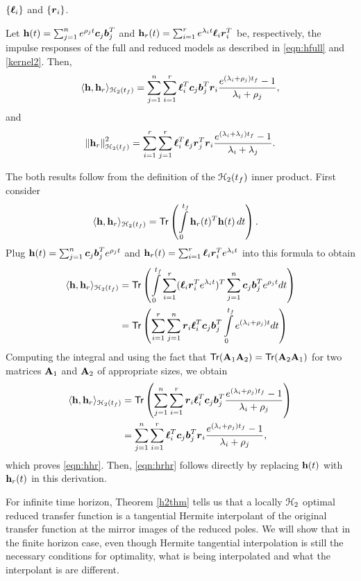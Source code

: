 \documentclass[twocolumn]{autart}
\begin{document}
$\{\boldsymbol{\ell}_i\}$ and $\{\boldsymbol{r}_i\}$.
\begin{Lemma}\label{minnerexp}

Let  $\mathbf{h} (t)= \sum_{j=1}^n e^{\rho_jt} \boldsymbol{c}_j \boldsymbol{b}_j^T $ and $\mathbf{h}_r(t) = \sum_{i=1}^r e^{\lambda_it}\boldsymbol{\ell}_i  \boldsymbol{r}_i^T $ be, respectively, the impulse responses of the full and reduced models  as described in \eqref{eqn:hfull} and \eqref{kernel2}.
Then,
\begin{align} \label{eqn:hhr}
\langle\mathbf{h}, \mathbf{h}_r\rangle_{\EuScript{H}_2({t_f})}=\sum_{j=1}^n\sum_{i=1}^r\boldsymbol{\ell}_{i}^T\boldsymbol{c}_j\boldsymbol{b}_j^T\boldsymbol{r}_{i}\dfrac{e^{(\lambda_i+\rho_j){t_f}}-1}{\lambda_i+\rho_j},
\end{align}
and
\begin{align} \label{eqn:hrhr}
\left\lVert\mathbf{h}_r\right\rVert_{\EuScript{H}_2({t_f})}^2= \sum_{i=1}^r\sum_{j=1}^r\boldsymbol{\ell}_{i}^T\boldsymbol{\ell}_{j}\boldsymbol{r}_{j}^T\boldsymbol{r}_{i}\dfrac{e^{(\lambda_i+\lambda_j){t_f}}-1}{\lambda_i+\lambda_j}.
\end{align}
\end{Lemma}
\begin{pf}
The both results  follow from the definition of the $\EuScript{H}_2(t_f)$ inner product.  First consider
\begin{align*}
\langle\h, \h_r\rangle_{\ch_2({\tf})}&=\mathsf{Tr}\left(\int_0^{\tf}\h_r(t)^T\h(t)\, dt\right).
\end{align*}
Plug $\mathbf{h} (t)= \sum_{j=1}^n \boldsymbol{c}_j \boldsymbol{b}_j^T e^{\rho_jt}$ and $\mathbf{h}_r(t) = \sum_{i=1}^r \boldsymbol{\ell}_i  \boldsymbol{r}_i^T e^{\lambda_it}$
into this formula to obtain
\begin{align*}
\langle\h, \h_r\rangle_{\ch_2({\tf})}&=\mathsf{Tr} \left(\int_0^{\tf}\sum_{i=1}^r(\lc_{i}\rc_{i}^Te^{\lambda_it})^T\sum_{j=1}^n\cc_j\bb_j^Te^{\rho_jt}dt\right)\\
 &= \mathsf{Tr} \left(\sum_{i=1}^r 
\sum_{j=1}^n 
\rc_{i}\lc_{i}^T\cc_j \bb_j^T \int_0^{\tf}e^{(\lambda_i + \rho_j )t} dt\right)
\end{align*}
Computing the integral and using the fact that $\mathsf{Tr}(\mathbf{A}_1 \mathbf{A}_2) = \mathsf{Tr}(\mathbf{A}_2 \mathbf{A}_1)$  for two matrices $\mathbf{A}_1$ and $\mathbf{A}_2$ of  appropriate sizes,   we obtain
\begin{align*}
\langle\mathbf{h}, \mathbf{h}_r\rangle_{\EuScript{H}_2({t_f})}&=\mathsf{Tr}\left(\sum_{j=1}^n\sum_{i=1}^r\boldsymbol{r}_{i}\boldsymbol{\ell}_{i}^T\boldsymbol{c}_j\boldsymbol{b}_j^T\dfrac{e^{(\lambda_i+\rho_j){t_f}}-1}{\lambda_i+\rho_j}\right)\\
&=\sum_{j=1}^n\sum_{i=1}^r\boldsymbol{\ell}_{i}^T\boldsymbol{c}_j\boldsymbol{b}_j^T\boldsymbol{r}_{i}\dfrac{e^{(\lambda_i+\rho_j){t_f}}-1}{\lambda_i+\rho_j},
\end{align*}
which proves \eqref{eqn:hhr}. Then, \eqref{eqn:hrhr} follows directly by replacing $\mathbf{h}(t)$ with $\mathbf{h}_r(t)$ in this derivation. 
\end{pf}
For infinite time horizon, Theorem \ref{h2thm} tells us that a locally $\EuScript{H}_2$ optimal reduced transfer function is a tangential Hermite interpolant of the original transfer function at the mirror images of the reduced poles. We will show that in the finite horizon case, even though Hermite tangential interpolation is still the necessary conditions for optimality,  what is being interpolated and what the interpolant is are different.
\end{document}
